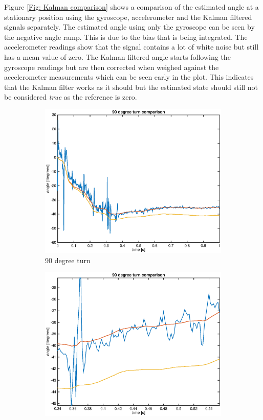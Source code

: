 \documentclass[a4paper,11pt]{kth-mag}
\begin{document}
Figure \ref{Fig: Kalman comparison} shows a comparison of the estimated angle at a stationary position using the gyroscope, accelerometer and the Kalman filtered signals separately. The estimated angle using only the gyroscope can be seen by the negative angle ramp. This is due to the bias that is being integrated. The accelerometer readings show that the signal contains a lot of white noise but still has a mean value of zero. 
The Kalman filtered angle starts following the gyroscope readings but are then corrected when weighed against the accelerometer measurements which can be seen early in the plot. 
This indicates that the Kalman filter works as it should but the estimated state should still not be considered \textit{true} as the reference is zero. 


\begin{figure}
\centering
\begin{subfigure}{.5\textwidth}
  \centering
  \includegraphics[width=\textwidth]{Kalmancomparisonturn.eps}
  \caption{90 degree turn}
  \label{Fig: Kalmanturn}
\end{subfigure}%
\begin{subfigure}{.5\textwidth}
  \centering
  \includegraphics[width=\textwidth]{Kalmancomparisonturnzoom.eps}

\end{subfigure}
\end{figure}
\end{document}
